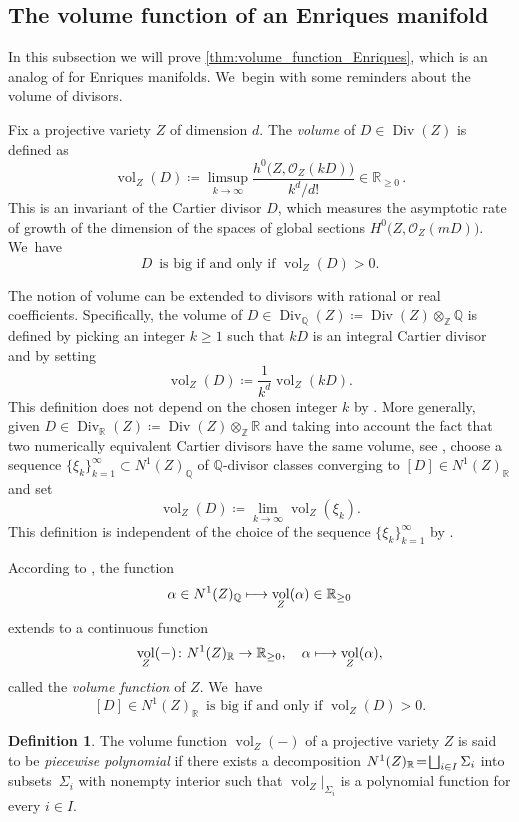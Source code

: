 \documentclass[JEP,XML,SOM,Unicode,published]{cedram}
\newcommand\mto{\mathchoice{\longmapsto}{\mapsto}{\mapsto}{\mapsto}}
\let\oldbigsqcup\bigsqcup
\renewcommand{\bigsqcup}{\mathop{\textstyle\oldbigsqcup}\displaylimits}
\theoremstyle{plain}
\theoremstyle{definition}
\newtheorem{dfn}[thm]{Definition}
\newcommand{\Z}{\mathbb{Z}}
\newcommand{\Q}{\mathbb{Q}}
\newcommand{\R}{\mathbb{R}}
\newcommand{\OO}{\mathcal{O}}
\DeclareMathOperator{\vol}{vol}
\DeclareMathOperator{\Div}{Div}
\begin{document}
\subsection{The volume function of an Enriques manifold}
\label{subsection:volume_function_Enriques}

In this subsection we will prove \autoref{thm:volume_function_Enriques}, which is an analog of \cite[Th.\,1.6(2)]{Denisi23} for Enriques manifolds. We~begin with some reminders about the volume of divisors.

Fix a projective variety $Z$ of dimension $d$. The \emph{volume} of $D \in \Div(Z)$ is defined as
\[
\vol_Z (D) \coloneqq \limsup_{k \to \infty} \frac{h^0 \bigl(Z, \OO_Z(kD) \bigr)}{k^d/d!} \in \R_{\geq 0} \,.
\]
This is an invariant of the Cartier divisor $D$, which measures the asymptotic rate of growth of the dimension of the spaces of global sections $H^0 \bigl(Z, \OO_Z(mD) \bigr)$. We~have
\[
D \,\text{ is big if and only if } \vol_Z(D)>0.
\]

The notion of volume can be extended to divisors with rational or real coefficients. Specifically, the volume of $D \in \Div_{\Q}(Z) \coloneqq \Div(Z) \otimes_{\Z} \Q$ is defined by picking an integer $k \geq 1$ such that $kD$ is an integral Cartier divisor and by setting
\[
\vol_Z(D) \coloneqq \frac{1}{k^{d}} \vol_Z (kD).
\]
This definition does not depend on the chosen integer $k$ by \cite[Lem.\,2.2.38]{Laz04book_I}. More generally, given $D \in \Div_{\R}(Z) \coloneqq \Div(Z)\otimes_{\Z} \R$ and taking into account the fact that two numerically equivalent Cartier divisors have the same volume, see \cite[Prop.\,2.2.41]{Laz04book_I}, choose a sequence $\{\xi_k\}_{k=1}^\infty \subset N^1(Z)_\Q$ of $\Q$\nobreakdash-divisor classes converging to $[D] \in N^1(Z)_\R$ and set
\[
\vol_Z(D) \coloneqq \lim_{k \to \infty} \vol_Z(\xi_k).
\]
This definition is independent of the choice of the sequence $\{\xi_k\}_{k=1}^\infty$ by \cite[Th.\,2.2.44]{Laz04book_I}.

According to \cite[Cor.\,2.2.45]{Laz04book_I}, the function
\[
\alpha \in N^1(Z)_\Q \mto \vol_Z(\alpha) \in \R_{\geq 0}
\]
extends to a continuous function
\[
\vol_Z(-) \colon N^1(Z)_\R \to \R_{\geq 0}, \quad \alpha \mto \vol_Z(\alpha),
\]
called the \emph{volume function} of $Z$. We~have
\[
[D] \in N^1(Z)_\R \,\text{ is big if and only if } \vol_Z(D)>0.
\]

\begin{dfn}
\label{dfn:piecewise_polynomial}
The volume function $\vol_Z(-)$ of a projective variety $Z$ is said to be \emph{piecewise polynomial} if there exists a decomposition $N^1(Z)_\R \!=\! \bigsqcup_{i \in I} \Sigma_i$ into subsets~$\Sigma_i$ with nonempty interior such that $\vol_Z |_{\Sigma_i}$ is a polynomial function for every $i \!\in\! I$.
\end{dfn}
\end{document}
